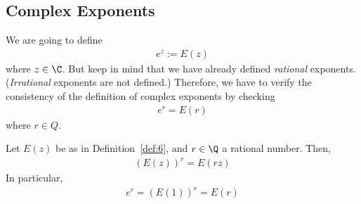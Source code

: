 \documentclass[thmcnt=section, 12pt]{elegantbook}
\begin{document}
\subsection{Complex Exponents}


\par We are going to define
\begin{align*}
    e^z := E(z)
\end{align*}
where $z \in \C$. But keep in mind that we have already defined \textit{rational} exponents. (\textit{Irrational} exponents are not defined.) Therefore, we have to verify the consistency of the definition of complex exponents by checking 
\begin{align*}
    e^r = E(r)
\end{align*}
where $r \in Q$.

\begin{proposition}
    Let $E(z)$ be as in Definition~\ref{def:6}, and $r \in \Q$ a rational number. Then, 
    \begin{align*}
        (E(z))^r = E(r z)
    \end{align*}
    In particular, 
    \begin{align*}
        e^r = (E(1))^r = E(r)
    \end{align*}
\end{proposition}
\end{document}
